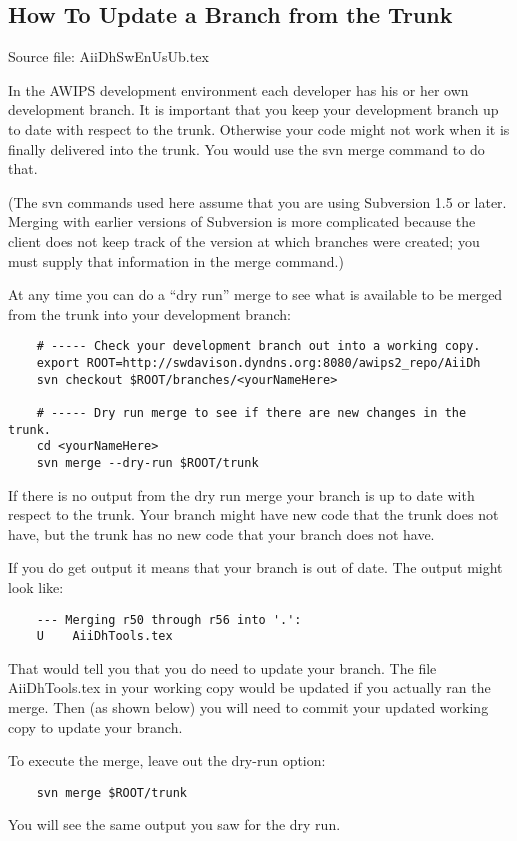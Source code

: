 
\subsection{How To Update a Branch from the Trunk}

Source file: AiiDhSwEnUsUb.tex

In the AWIPS development environment each developer has
his or her own development branch.  It is important that you
keep your development branch up to date with respect to the
trunk.  Otherwise your code might not work when it is
finally delivered into the trunk.  You would use the svn
merge command to do that.

(The svn commands used here assume that you are using
Subversion 1.5 or later.  Merging with earlier versions 
of Subversion is more complicated because the client does
not keep track of the version at which branches were 
created; you must supply that information in the
merge command.)

At any time you can do a ``dry run'' merge to see what
is available to be merged from the trunk into your
development branch:

\begin{verbatim}
    # ----- Check your development branch out into a working copy.
    export ROOT=http://swdavison.dyndns.org:8080/awips2_repo/AiiDh
    svn checkout $ROOT/branches/<yourNameHere>

    # ----- Dry run merge to see if there are new changes in the trunk.
    cd <yourNameHere>
    svn merge --dry-run $ROOT/trunk
\end{verbatim}

If there is no output from the dry run merge your branch is up to
date with respect to the trunk.  Your branch might have new code
that the trunk does not have, but the trunk has no new code that your
branch does not have.

If you do get output it means that your branch is out of date.
The output might look like:
\begin{verbatim}
    --- Merging r50 through r56 into '.':
    U    AiiDhTools.tex
\end{verbatim}

That would tell you that you do need to update your
branch.  The file AiiDhTools.tex in your working 
copy would be updated if you actually ran the merge.  
Then (as shown below) you will need to commit your
updated working copy to update your branch.

To execute the merge, leave out the dry-run option:
\begin{verbatim}
    svn merge $ROOT/trunk
\end{verbatim}
You will see the same output you saw for the dry run.

